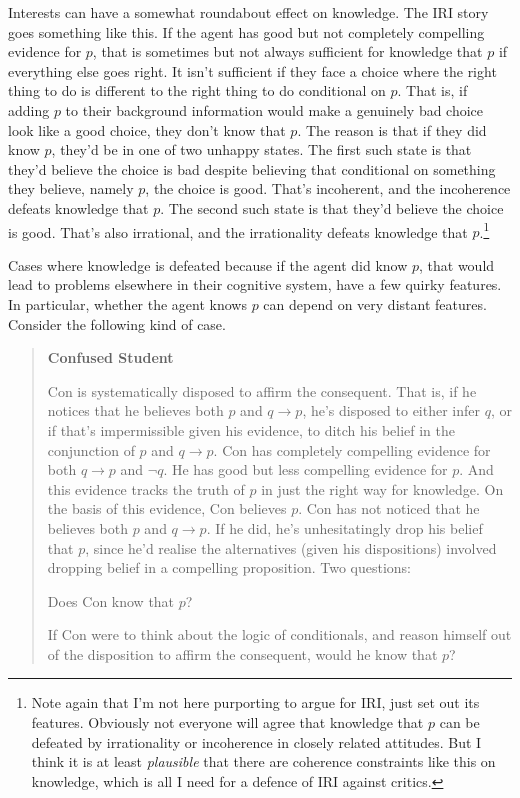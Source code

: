 \documentclass[oneside]{book}
\begin{document}
Interests can have a somewhat roundabout effect on knowledge. The IRI story goes something like this. If the agent has good but not completely compelling evidence for $p$, that is sometimes but not always sufficient for knowledge that $p$ if everything else goes right. It isn't sufficient if they face a choice where the right thing to do is different to the right thing to do conditional on $p$. That is, if adding $p$ to their background information would make a genuinely bad choice look like a good choice, they don't know that $p$. The reason is that if they did know $p$, they'd be in one of two unhappy states. The first such state is that they'd believe the choice is bad despite believing that conditional on something they believe, namely $p$, the choice is good. That's incoherent, and the incoherence defeats knowledge that $p$. The second such state is that they'd believe the choice is good. That's also irrational, and the irrationality defeats knowledge that $p$.\footnote{Note again that I'm not here purporting to argue for IRI, just set out its features. Obviously not everyone will agree that knowledge that $p$ can be defeated by irrationality or incoherence in closely related attitudes. But I think it is at least \textit{plausible} that there are coherence constraints like this on knowledge, which is all I need for a defence of IRI against critics.} 

Cases where knowledge is defeated because if the agent did know $p$, that would lead to problems elsewhere in their cognitive system, have a few quirky features. In particular, whether the agent knows $p$ can depend on very distant features. Consider the following kind of case.

\begin{quote}

\textbf{Confused Student}

Con is systematically disposed to affirm the consequent. That is, if he notices that he believes both $p$ and $q \rightarrow p$, he's disposed to either infer $q$, or if that's impermissible given his evidence, to ditch his belief in the conjunction of $p$ and $q \rightarrow p$. Con has completely compelling evidence for both $q \rightarrow p$ and $\neg q$. He has good but less compelling evidence for $p$. And this evidence tracks the truth of $p$ in just the right way for knowledge. On the basis of this evidence, Con believes $p$. Con has not noticed that he believes both $p$ and $q \rightarrow p$. If he did, he's unhesitatingly drop his belief that $p$, since he'd realise the alternatives (given his dispositions) involved dropping belief in a compelling proposition. Two questions:
\begin{itemize*}
\item Does Con know that $p$?
\item If Con were to think about the logic of conditionals, and reason himself out of the disposition to affirm the consequent, would he know that $p$?
\end{itemize*}
\end{quote}
\end{document}
